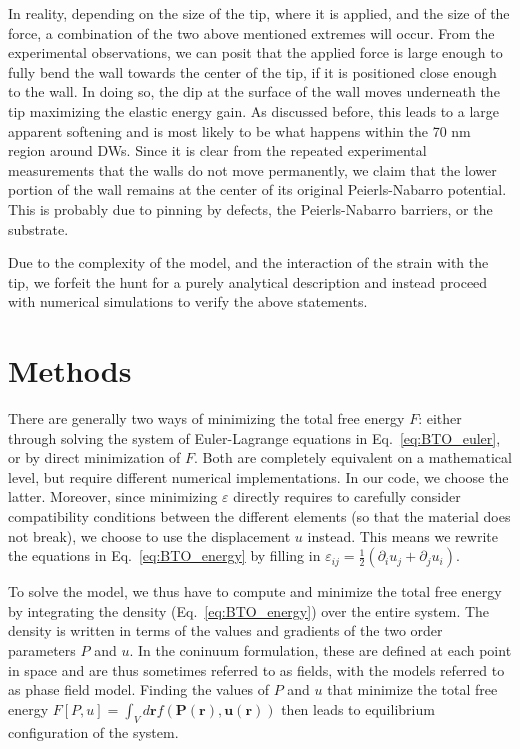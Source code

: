In reality, depending on the size of the tip, where it is applied, and the size of the force, a combination of the two above mentioned extremes will occur.
From the experimental observations, we can posit that the applied force is large enough to fully bend the wall towards the center of the tip, if it is positioned close enough to the wall.
In doing so, the dip at the surface of the wall moves underneath the tip maximizing the elastic energy gain.
As discussed before, this leads to a large apparent softening and is most likely to be what happens within the 70 nm region around DWs.
Since it is clear from the repeated experimental measurements that the walls do not move permanently, we claim that the lower portion of the wall remains at the center of its original Peierls-Nabarro potential.
This is probably due to pinning by defects, the Peierls-Nabarro barriers, or the substrate.

Due to the complexity of the model, and the interaction of the strain with the tip, we forfeit the hunt for a purely analytical description and instead proceed with numerical simulations to verify the above statements.

\section{Methods}
There are generally two ways of minimizing the total free energy $F$: either through solving the system of Euler-Lagrange equations in Eq.~\eqref{eq:BTO_euler}, or by direct minimization of $F$.
Both are completely equivalent on a mathematical level, but require different numerical implementations.
In our code, we choose the latter.
Moreover, since minimizing $\varepsilon$ directly requires to carefully consider compatibility conditions between the different elements (so that the material does not break)\cite{Marton2007}, we choose to use the displacement $u$ instead.
This means we rewrite the equations in Eq.~\eqref{eq:BTO_energy} by filling in $\varepsilon_{ij} = \frac{1}{2}(\partial_i u_j + \partial_j u_i)$.

To solve the model, we thus have to compute and minimize the total free energy by integrating the density (Eq.~\eqref{eq:BTO_energy}) over the entire system.
The density is written in terms of the values and gradients of the two order parameters $P$ and $u$.
In the coninuum formulation, these are defined at each point in space and are thus sometimes referred to as fields, with the models referred to as phase field model.
Finding the values of $P$ and $u$ that minimize the total free energy $F[P,u]=\int_V d\bm{r} f(\bm{P}(\bm{r}),\bm{u}(\bm{r}))$ then leads to equilibrium configuration of the system.

